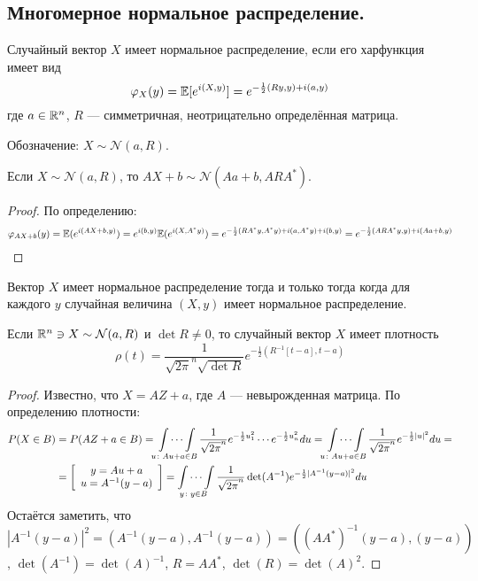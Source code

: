 \subsection{Многомерное нормальное распределение.}
\begin{definition}
    Случайный вектор $X$ имеет нормальное распределение, если его харфункция имеет вид
    \[
        \varphi_X(y) = \mathbb{E}[e^{i(X, y)}] = e^{-\frac{1}{2}(Ry, y) + i(a, y)}
    \]
    где $a \in \mathbb{R}^n$, $R$ --- симметричная, неотрицательно определённая матрица.

    Обозначение: $X \sim \mathcal{N}(a, R)$.
\end{definition}
\begin{proposal}
    Если $X \sim \mathcal{N}(a, R)$, то $AX + b \sim \mathcal{N}(Aa + b, ARA^*)$.
\end{proposal}
\begin{proof}
    По определению:
    \begin{align*}
        \varphi_{AX + b}(y) = \mathbb{E}(e^{i(AX + b, y)}) = e^{i(b, y)}\mathbb{E}(e^{i(X, A^*y)}) =
        e^{-\frac{1}{2}(RA^*y, A^*y) + i(a, A^*y) + i(b, y)} = e^{-\frac{1}{2}(ARA^*y, y) + i(Aa + b, y)}
    \end{align*}
\end{proof}
\begin{theorem}
    Вектор $X$ имеет нормальное распределение тогда и только тогда когда для каждого $y$
    случайная величина $(X, y)$ имеет нормальное распределение.
\end{theorem}
\begin{theorem}
    Если $\mathbb{R}^n \ni X \sim \mathcal{N}(a, R)$ и $\det R \neq 0$, то случайный вектор $X$ имеет плотность
    \[
        \rho(t) = \frac{1}{\sqrt {2\pi}^n \sqrt {\det R}}e^{-\frac{1}{2}(R^{-1} [t - a], t - a)}
    \]
\end{theorem}
\begin{proof}
    Известно, что $X = AZ + a$, где $A$ --- невырожденная матрица. По определению плотности:
    \begin{align*}
        P(X \in B) &= P(AZ + a \in B) = \idotsint\limits_{u \colon Au + a \in B} \frac{1}{\sqrt {2\pi}^n}
        e^{-\frac{1}{2}u_1^2}\cdots e^{-\frac{1}{2}u_n^2}du =
        \idotsint\limits_{u \colon Au + a \in B} \frac{1}{\sqrt {2\pi}^n}
        e^{-\frac{1}{2}|u|^2}du = \\
        &=
        \left[ \begin{array}{c}
                   y = Au + a\\
                   u = A^{-1}(y - a)
        \end{array} \right] =
        \idotsint\limits_{y \colon y \in B} \frac{1}{\sqrt {2\pi}^n} \det(A^{-1})
        e^{-\frac{1}{2}|A^{-1}(y - a)|^2}du
    \end{align*}
    Остаётся заметить, что $|A^{-1}(y - a)|^2 = (A^{-1}(y - a), A^{-1}(y - a)) = ((AA^*)^{-1}(y-a), (y-a))$,
    $\det(A^{-1}) = \det(A)^{-1}$, $R = AA^*$, $\det(R) = \det(A)^2$.
\end{proof}